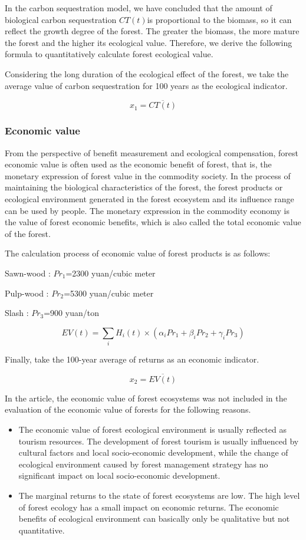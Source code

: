 In the carbon sequestration model, we have concluded that the amount of biological carbon sequestration $CT(t)$is proportional to the biomass, so it can reflect the growth degree of the forest. The greater the biomass, the more mature the forest and the higher its ecological value. Therefore, we derive the following formula to quantitatively calculate forest ecological value.

Considering the long duration of the ecological effect of the forest, we take the average value of carbon sequestration for 100 years as the ecological indicator.

$$
x_1=\overline{CT(t)}
$$


\subsubsection{Economic value}
From the perspective of benefit measurement and ecological compensation, forest economic value is often used as the economic benefit of forest, that is, the monetary expression of forest value in the commodity society. In the process of maintaining the biological characteristics of the forest, the forest products or ecological environment generated in the forest ecosystem and its influence range can be used by people. The monetary expression in the commodity economy is the value of forest economic benefits, which is also called the total economic value of the forest.

The calculation process of economic value of forest products is as follows:

Sawn-wood       :   $Pr_1$=2300 yuan/cubic meter

Pulp-wood       :   $Pr_2$=5300 yuan/cubic meter

Slash           :   $Pr_3$=900 yuan/ton

$$EV(t)=\sum_{i}H_i(t)\times(\alpha_iPr_{1}+\beta_i Pr_{2}+\gamma_iPr_{3})$$

Finally, take the 100-year average of returns as an economic indicator.

$$x_2=\overline{EV(t)}$$

In the article, the economic value of forest ecosystems was not included in the evaluation of the economic value of forests for the following reasons.

\begin{itemize}
    \item The economic value of forest ecological environment is usually reflected as tourism resources. The development of forest tourism is usually influenced by cultural factors and local socio-economic development, while the change of ecological environment caused by forest management strategy has no significant impact on local socio-economic development.
    \item The marginal returns to the state of forest ecosystems are low. The high level of forest ecology has a small impact on economic returns. The economic benefits of ecological environment can basically only be qualitative but not quantitative.
\end{itemize}

